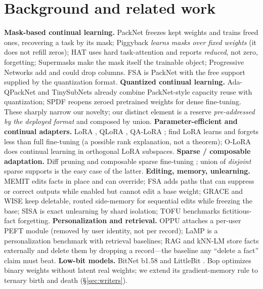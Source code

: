 \documentclass[11pt]{article}
\begin{document}
\section{Background and related work}
\textbf{Mask-based continual learning.} PackNet \citep{packnet} freezes kept weights and trains freed ones,
recovering a task by its mask; Piggyback \citep{piggyback} \emph{learns masks over fixed weights} (it does
not refill zeros); HAT \citep{hat} uses hard task-attention and reports \emph{reduced}, not zero,
forgetting; Supermasks \citep{supermasks} make the mask itself the trainable object; Progressive Networks
\citep{progressivenn} add and could drop columns. FSA is PackNet with the free support supplied by the
quantization format. \textbf{Quantized continual learning.} Ada-QPackNet \citep{adaqpacknet} and
TinySubNets \citep{tinysubnets} already combine PackNet-style capacity reuse with quantization; SPDF
\citep{spdf} reopens zeroed pretrained weights for dense fine-tuning. These sharply narrow our novelty; our
distinct element is a reserve \emph{pre-addressed by the deployed format} and composed by union.
\textbf{Parameter-efficient and continual adapters.} LoRA \citep{lora}, QLoRA \citep{qlora}, QA-LoRA
\citep{qalora}; \citet{loralearnsless} find LoRA learns and forgets less than full fine-tuning (a possible
rank explanation, not a theorem); O-LoRA \citep{olora} does continual learning in orthogonal LoRA
subspaces. \textbf{Sparse / composable adaptation.} Diff pruning \citep{diffpruning} and composable sparse
fine-tuning \citep{composablesft}; union of \emph{disjoint} sparse supports is the easy case of the latter.
\textbf{Editing, memory, unlearning.} MEMIT \citep{memit} edits facts in place and can override; FSA adds paths that can
suppress or correct outputs while enabled but cannot edit a base weight; GRACE \citep{grace} and WISE \citep{wise} keep deletable, routed side-memory for sequential edits
while freezing the base; SISA \citep{sisa} is exact unlearning by shard isolation; TOFU \citep{tofu}
benchmarks fictitious-fact forgetting. \textbf{Personalization and retrieval.} OPPU \citep{oppu} attaches a
per-user PEFT module (removed by user identity, not per record); LaMP \citep{lamp} is a personalization
benchmark with retrieval baselines; RAG \citep{rag} and kNN-LM \citep{knnlm} store facts externally and
delete them by dropping a record---the baseline any ``delete a fact'' claim must beat.
\textbf{Low-bit models.} BitNet b1.58 \citep{bitnet158,bitnet2b4t} and LittleBit \citep{littlebit}. Bop \citep{bop} optimizes binary
weights without latent real weights; we extend its gradient-memory rule to ternary birth and death
(\S\ref{sec:writers}).
\end{document}
